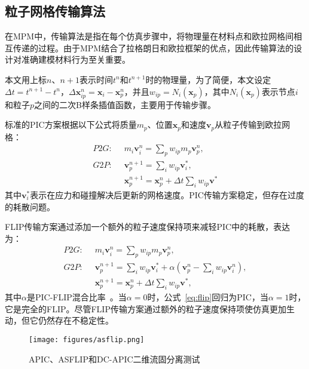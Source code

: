 \subsection{粒子网格传输算法}
在MPM中，传输算法是指在每个仿真步骤中，将物理量在材料点和欧拉网格间相互传递的过程。由于MPM结合了拉格朗日和欧拉框架的优点，因此传输算法的设计对准确建模材料行为至关重要。

本文用上标$n$、$n+1$表示时间$t^n$和$t^{n+1}$时的物理量，为了简便，本文设定$\Delta t=t^{n+1}-t^n$，$\Delta \mathbf{x}_{ip}^{n}=\mathbf{x}_i-\mathbf{x}_p^n$，并且$w_{ip}=N_i(\mathbf{x}_p)$，其中$N_i(\mathbf{x}_p)$表示节点$i$和粒子$p$之间的二次B样条插值函数，主要用于传输步骤。

标准的PIC方案根据以下公式将质量$m_p$、位置$\mathbf{x}_p$和速度$\mathbf{v}_p$从粒子传输到欧拉网格：
\begin{equation}
    \begin{aligned}
    P2G: \;\;    
    &m_i\mathbf{v}_i^n =\sum_{p}w_{ip}m_p\mathbf{v}_p^n, \\
    G2P:\;\; & \mathbf{v}_p^{n+1}=\sum_iw_{ip}\mathbf{v}_i^*,\\
    &\mathbf{x}_p^{n+1}=\mathbf{x}_p^n+\Delta t\sum_iw_{ip}\mathbf{v^*}
    \end{aligned}
\end{equation}
其中$\mathbf{v}_i^*$表示在应力和碰撞解决后更新的网格速度。PIC传输方案稳定，但存在过度的耗散问题。

FLIP传输方案\cite{zhu2005animating}通过添加一个额外的粒子速度保持项来减轻PIC中的耗散，表达为：
\begin{equation}
    \begin{aligned}
    P2G: \;\;    
    &m_i\mathbf{v}_i^n =\sum_{p}w_{ip}m_p\mathbf{v}_p^n, \\
    G2P:\;\; & \mathbf{v}_p^{n+1}=\sum_iw_{ip}\mathbf{v}_i^* + \alpha(\mathbf{v}_p^n-\sum_iw_{ip}\mathbf{v}_i^n),\\
    &\mathbf{x}_p^{n+1}=\mathbf{x}_p^n+\Delta t\sum_iw_{ip}\mathbf{v^*},
    \end{aligned}
    \label{eq:flip}
\end{equation}
其中$\alpha$是PIC-FLIP混合比率~\cite{bridson2015fluid}。当$\alpha=0$时，公式~\eqref{eq:flip}回归为PIC，当$\alpha=1$时，它是完全的FLIP。尽管FLIP传输方案通过额外的粒子速度保持项使仿真更加生动，但它仍然存在不稳定性。

\begin{figure}
    \centering
    \texttt{[image: figures/asflip.png]}
    \caption{APIC、ASFLIP和DC-APIC二维流固分离测试}
    \label{fig:asflip}
\end{figure}

